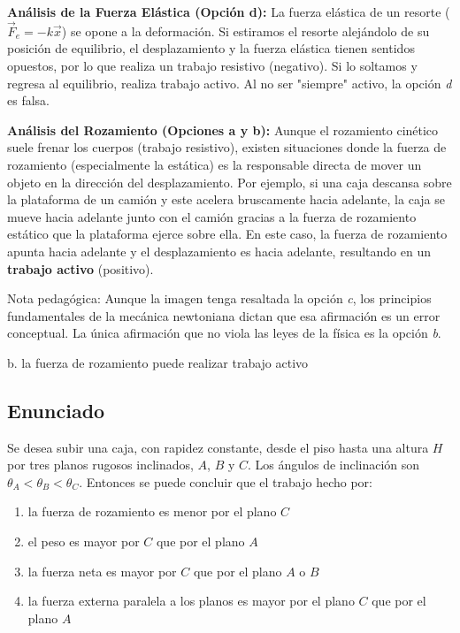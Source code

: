 \documentclass[12pt, a4paper]{article}
\begin{document}
\textbf{Análisis de la Fuerza Elástica (Opción d):}
La fuerza elástica de un resorte ($\vec{F}_e = -k\vec{x}$) se opone a la deformación. Si estiramos el resorte alejándolo de su posición de equilibrio, el desplazamiento y la fuerza elástica tienen sentidos opuestos, por lo que realiza un trabajo resistivo (negativo). Si lo soltamos y regresa al equilibrio, realiza trabajo activo. Al no ser "siempre" activo, la opción \textit{d} es falsa.

\textbf{Análisis del Rozamiento (Opciones a y b):}
Aunque el rozamiento cinético suele frenar los cuerpos (trabajo resistivo), existen situaciones donde la fuerza de rozamiento (especialmente la estática) es la responsable directa de mover un objeto en la dirección del desplazamiento. 
Por ejemplo, si una caja descansa sobre la plataforma de un camión y este acelera bruscamente hacia adelante, la caja se mueve hacia adelante junto con el camión gracias a la fuerza de rozamiento estático que la plataforma ejerce sobre ella. En este caso, la fuerza de rozamiento apunta hacia adelante y el desplazamiento es hacia adelante, resultando en un \textbf{trabajo activo} (positivo). 

Nota pedagógica: Aunque la imagen tenga resaltada la opción \textit{c}, los principios fundamentales de la mecánica newtoniana dictan que esa afirmación es un error conceptual. La única afirmación que no viola las leyes de la física es la opción \textit{b}.

\begin{tcolorbox}[colback=green!5!white, colframe=green!50!black, title=Respuesta Correcta]
\centering \Large b. la fuerza de rozamiento puede realizar trabajo activo
\end{tcolorbox}

\newpage

\subsection*{Enunciado}
Se desea subir una caja, con rapidez constante, desde el piso hasta una altura $H$ por tres planos rugosos inclinados, $A$, $B$ y $C$. Los ángulos de inclinación son $\theta_A < \theta_B < \theta_C$. Entonces se puede concluir que el trabajo hecho por:
\begin{enumerate}[label=\alph*.]
    \item la fuerza de rozamiento es menor por el plano $C$
    \item el peso es mayor por $C$ que por el plano $A$
    \item la fuerza neta es mayor por $C$ que por el plano $A$ o $B$
    \item la fuerza externa paralela a los planos es mayor por el plano $C$ que por el plano $A$
\end{enumerate}
\end{document}
